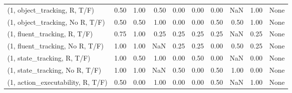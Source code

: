 \begin{table*}[h!]
\begin{adjustbox}{width=2\columnwidth,center}
\begin{tabular}{lrrr|rrr|rrr}
\midrule
(1, object\_tracking, R, T/F)         &                      0.50 &                  1.00 &                      0.50 &                          0.00 &                      0.00 &                          0.00 &                                    NaN &                               1.00 &                                  None \\
(1, object\_tracking, No R, T/F)      &                      0.50 &                  0.50 &                      1.00 &                          0.00 &                      0.00 &                          0.50 &                                   0.50 &                               1.00 &                                  None \\
(1, fluent\_tracking, R, T/F)         &                      0.75 &                  1.00 &                      0.25 &                          0.25 &                      0.25 &                          0.25 &                                    NaN &                               0.25 &                                  None \\
(1, fluent\_tracking, No R, T/F)      &                      1.00 &                  1.00 &                       NaN &                          0.25 &                      0.25 &                          0.00 &                                   0.50 &                               0.25 &                                  None \\
(1, state\_tracking, R, T/F)          &                      1.00 &                  0.50 &                      1.00 &                          0.00 &                      0.50 &                          0.00 &                                    NaN &                               0.00 &                                  None \\
(1, state\_tracking, No R, T/F)       &                      1.00 &                  1.00 &                       NaN &                          0.50 &                      0.00 &                          0.50 &                                   1.00 &                               0.00 &                                  None \\
(1, action\_executability, R, T/F)    &                      0.50 &                  0.00 &                      1.00 &                          0.00 &                      0.00 &                          0.50 &                                    NaN &                               1.00 &                                  None \\

\end{tabular}
\end{adjustbox}
\end{table*}
